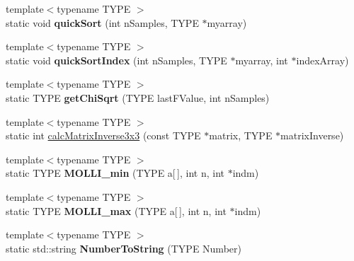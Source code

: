 \begin{DoxyCompactItemize}
\item 
\hypertarget{class_k_w_util_aacc2b444dd10145dea4367714527efa9}{{\footnotesize template$<$typename T\-Y\-P\-E $>$ }\\static void {\bfseries quick\-Sort} (int n\-Samples, T\-Y\-P\-E $\ast$myarray)}\label{class_k_w_util_aacc2b444dd10145dea4367714527efa9}

\item 
\hypertarget{class_k_w_util_aba1906d9b0de1262e0ce837b15e8401f}{{\footnotesize template$<$typename T\-Y\-P\-E $>$ }\\static void {\bfseries quick\-Sort\-Index} (int n\-Samples, T\-Y\-P\-E $\ast$myarray, int $\ast$index\-Array)}\label{class_k_w_util_aba1906d9b0de1262e0ce837b15e8401f}

\item 
\hypertarget{class_k_w_util_a2e55b0bcf1bbf1155654b748a7064cbf}{{\footnotesize template$<$typename T\-Y\-P\-E $>$ }\\static T\-Y\-P\-E {\bfseries get\-Chi\-Sqrt} (T\-Y\-P\-E last\-F\-Value, int n\-Samples)}\label{class_k_w_util_a2e55b0bcf1bbf1155654b748a7064cbf}

\item 
{\footnotesize template$<$typename T\-Y\-P\-E $>$ }\\static int \hyperlink{class_k_w_util_a80504801c382f1ac367bcf0787fb18c2}{calc\-Matrix\-Inverse3x3} (const T\-Y\-P\-E $\ast$matrix, T\-Y\-P\-E $\ast$matrix\-Inverse)
\item 
\hypertarget{class_k_w_util_a6401111c5ce49eb97e1c79bae84b3868}{{\footnotesize template$<$typename T\-Y\-P\-E $>$ }\\static T\-Y\-P\-E {\bfseries M\-O\-L\-L\-I\-\_\-min} (T\-Y\-P\-E a\mbox{[}$\,$\mbox{]}, int n, int $\ast$indm)}\label{class_k_w_util_a6401111c5ce49eb97e1c79bae84b3868}

\item 
\hypertarget{class_k_w_util_af0fee5e9d89e7c029c346804480d5832}{{\footnotesize template$<$typename T\-Y\-P\-E $>$ }\\static T\-Y\-P\-E {\bfseries M\-O\-L\-L\-I\-\_\-max} (T\-Y\-P\-E a\mbox{[}$\,$\mbox{]}, int n, int $\ast$indm)}\label{class_k_w_util_af0fee5e9d89e7c029c346804480d5832}

\item 
\hypertarget{class_k_w_util_a10aaa83c83c801ef07c95a29e1acdc4e}{{\footnotesize template$<$typename T\-Y\-P\-E $>$ }\\static std\-::string {\bfseries Number\-To\-String} (T\-Y\-P\-E Number)}\label{class_k_w_util_a10aaa83c83c801ef07c95a29e1acdc4e}


\end{DoxyCompactItemize}
